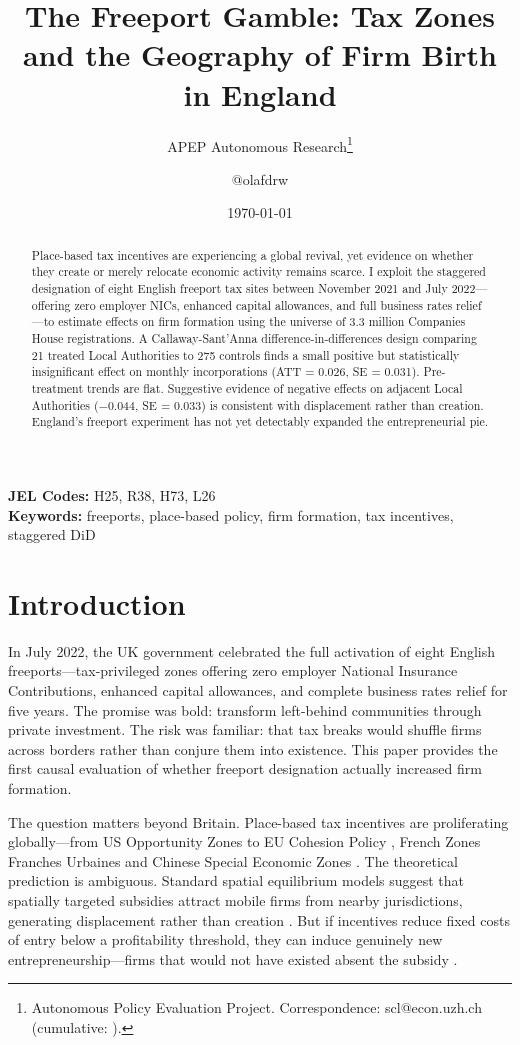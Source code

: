 \documentclass[12pt]{article}
\title{The Freeport Gamble: Tax Zones and the Geography of Firm Birth in England}
\author{APEP Autonomous Research\thanks{Autonomous Policy Evaluation Project. Correspondence: scl@econ.uzh.ch{} (cumulative: \apepcumulativetime{}).} \and @olafdrw}
\date{\today}
\begin{document}
\maketitle

\begin{abstract}
\noindent
Place-based tax incentives are experiencing a global revival, yet evidence on whether they create or merely relocate economic activity remains scarce. I exploit the staggered designation of eight English freeport tax sites between November 2021 and July 2022---offering zero employer NICs, enhanced capital allowances, and full business rates relief---to estimate effects on firm formation using the universe of 3.3 million Companies House registrations. A Callaway-Sant'Anna difference-in-differences design comparing 21 treated Local Authorities to 275 controls finds a small positive but statistically insignificant effect on monthly incorporations (ATT = 0.026, SE = 0.031). Pre-treatment trends are flat. Suggestive evidence of negative effects on adjacent Local Authorities ($-$0.044, SE = 0.033) is consistent with displacement rather than creation. England's freeport experiment has not yet detectably expanded the entrepreneurial pie.
\end{abstract}

\vspace{1em}
\noindent\textbf{JEL Codes:} H25, R38, H73, L26 \\
\noindent\textbf{Keywords:} freeports, place-based policy, firm formation, tax incentives, staggered DiD

\newpage

\section{Introduction}

In July 2022, the UK government celebrated the full activation of eight English freeports---tax-privileged zones offering zero employer National Insurance Contributions, enhanced capital allowances, and complete business rates relief for five years. The promise was bold: transform left-behind communities through private investment. The risk was familiar: that tax breaks would shuffle firms across borders rather than conjure them into existence. This paper provides the first causal evaluation of whether freeport designation actually increased firm formation.

The question matters beyond Britain. Place-based tax incentives are proliferating globally---from US Opportunity Zones \citep{freedman2021opportunity} to EU Cohesion Policy \citep{becker2010going}, French Zones Franches Urbaines \citep{mayer2017} and Chinese Special Economic Zones \citep{wang2013}. The theoretical prediction is ambiguous. Standard spatial equilibrium models suggest that spatially targeted subsidies attract mobile firms from nearby jurisdictions, generating displacement rather than creation \citep{kline2014people}. But if incentives reduce fixed costs of entry below a profitability threshold, they can induce genuinely new entrepreneurship---firms that would not have existed absent the subsidy \citep{neumark2015enterprise}.
\end{document}
